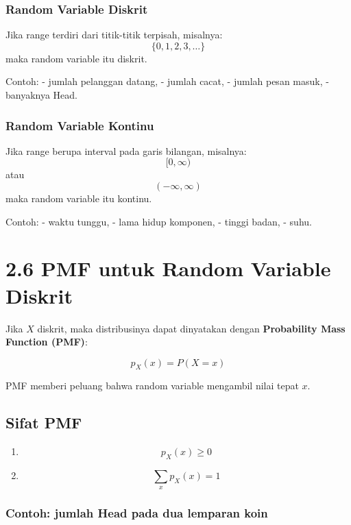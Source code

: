 \documentclass[
  letterpaper,
  DIV=11,
  numbers=noendperiod]{scrreprt}
\begin{document}
\subsubsection{Random Variable Diskrit}\label{random-variable-diskrit}

Jika range terdiri dari titik-titik terpisah, misalnya: \[
\{0,1,2,3,\dots\}
\] maka random variable itu diskrit.

Contoh: - jumlah pelanggan datang, - jumlah cacat, - jumlah pesan masuk,
- banyaknya Head.

\subsubsection{Random Variable Kontinu}\label{random-variable-kontinu}

Jika range berupa interval pada garis bilangan, misalnya: \[
[0,\infty)
\] atau \[
(-\infty,\infty)
\] maka random variable itu kontinu.

Contoh: - waktu tunggu, - lama hidup komponen, - tinggi badan, - suhu.

\section{2.6 PMF untuk Random Variable
Diskrit}\label{pmf-untuk-random-variable-diskrit}

Jika \(X\) diskrit, maka distribusinya dapat dinyatakan dengan
\textbf{Probability Mass Function (PMF)}:

\[
p_X(x) = P(X=x)
\]

PMF memberi peluang bahwa random variable mengambil nilai tepat \(x\).

\subsection{Sifat PMF}\label{sifat-pmf}

\begin{enumerate}
\def\labelenumi{\arabic{enumi}.}
\item
  \[
  p_X(x) \ge 0
  \]
\item
  \[
  \sum_x p_X(x) = 1
  \]
\end{enumerate}

\subsubsection{Contoh: jumlah Head pada dua lemparan
koin}\label{contoh-jumlah-head-pada-dua-lemparan-koin}
\end{document}
